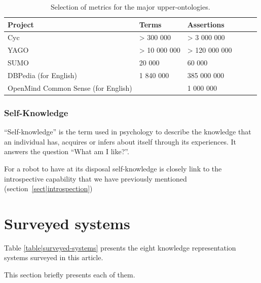 \documentclass[a4paper, twocolumn]{article}
\begin{document}
\begin{table}
\begin{center}

\begin{tabular}{llllll}
\toprule
{\bf Project} & {\bf Terms} & {\bf Assertions} \\
\midrule
Cyc & > 300 000 & > 3 000 000 & \\
YAGO & > 10 000 000 & > 120 000 000 \\
SUMO & 20 000 & 60 000 \\
DBPedia (for English) & 1 840 000 & 385 000 000\\
OpenMind Common Sense (for English) & & 1 000 000\\
\bottomrule

\end{tabular}
\end{center}
\caption{Selection of metrics for the major upper-ontologies.}
\label{table|upper_onto_metrics}
\end{table}



\subsubsection{Self-Knowledge}

``Self-knowledge'' is the term used in psychology to describe the knowledge
that an individual has, acquires or infers about itself through its
experiences. It answers the question ``What am I like?''.

For a robot to have at its disposal self-knowledge is closely link to the
introspective capability that we have previously mentioned
(section~\ref{sect|introspection})


\section{Surveyed systems}
\label{sect|surveyed-systems}

Table \ref{table|surveyed-systems} presents the eight knowledge representation
systems surveyed in this article.

This section briefly presents each of them.
\end{document}
